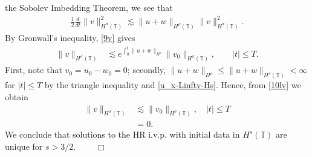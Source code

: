 \documentclass[12pt,reqno]{amsart}
\newcommand{\ci}{\mathbb{T}}
\theoremstyle{plain}  %
\theoremstyle{definition}
\begin{document}
\begin{appendices}
	the Sobolev Imbedding Theorem, we see that 
	\begin{equation}
		\begin{split}
			\frac{1}{2} \frac{d}{dt}
			\|v\|_{H^\sigma(\ci)}^2 \lesssim \|u+w\|_{H^\rho(\ci)}
			\|v\|_{H^\sigma(\ci)}^2.
			\label{9v}
		\end{split}
	\end{equation}
	By Gronwall's inequality, \eqref{9v} gives
	\begin{equation}
		\label{10lv}
		\begin{split}
			\|v\|_{H^\sigma(\ci)}
			& \lesssim e^{\int_0^t \|u+w\|_{H^{\rho}}}
			\|v_0\|_{H^\sigma(\ci)}, \qquad |t| \le T.
		\end{split}
	\end{equation}
	First, note that $v_0 = u_0 - w_0 = 0$; secondly, $\|u + w \|_{H^\rho}
	\le \|u + w \|_{H^s(\ci)} < \infty$ for $|t| \le T$ by
	the triangle inequality and \eqref{u_x-Linfty-Hs}. Hence, from
	\eqref{10lv} we obtain
	\begin{equation*}
		\begin{split}
			\|v\|_{H^\sigma(\ci)}
			& \lesssim \|v_0\|_{H^\sigma(\ci)}, \quad |t| \le T	
			\\
			& = 0.
		\end{split}
	\end{equation*}
	We conclude that solutions to the HR i.v.p. with initial data in
	$H^s(\ci)$ are unique for $s > 3/2$.  $\qquad
	\Box$

\end{appendices}
\end{document}
